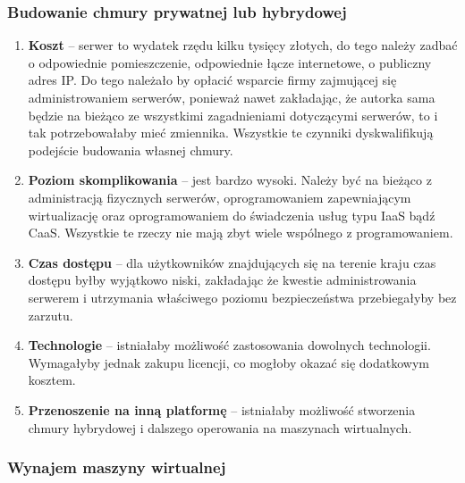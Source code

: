 \documentclass[12pt,a4paper,twoside,titlepage,openright]{book}
\begin{document}
\subsubsection{Budowanie chmury prywatnej lub hybrydowej}

\begin{enumerate}
	\item \textbf{Koszt} -- serwer to wydatek rzędu kilku tysięcy złotych, do tego należy zadbać o odpowiednie pomieszczenie, odpowiednie łącze internetowe, o publiczny adres IP. Do tego należało by opłacić wsparcie firmy zajmującej się administrowaniem serwerów, ponieważ nawet zakładając, że autorka sama będzie na bieżąco ze wszystkimi zagadnieniami dotyczącymi serwerów, to i tak potrzebowałaby mieć zmiennika. Wszystkie te czynniki dyskwalifikują podejście budowania własnej chmury. 
	\item \textbf{Poziom skomplikowania} -- jest bardzo wysoki. Należy być na bieżąco z administracją fizycznych serwerów, oprogramowaniem zapewniającym wirtualizację oraz oprogramowaniem do świadczenia usług typu IaaS bądź CaaS. Wszystkie te rzeczy nie mają zbyt wiele wspólnego z programowaniem.
	\item \textbf{Czas dostępu} -- dla użytkowników znajdujących się na terenie kraju czas dostępu byłby wyjątkowo niski, zakładając że kwestie administrowania serwerem i utrzymania właściwego poziomu bezpieczeństwa przebiegałyby bez zarzutu.
	\item \textbf{Technologie} -- istniałaby możliwość zastosowania dowolnych technologii. Wymagałyby jednak zakupu licencji, co mogłoby okazać się dodatkowym kosztem.
	\item \textbf{Przenoszenie na inną platformę} -- istniałaby możliwość stworzenia chmury hybrydowej i dalszego operowania na maszynach wirtualnych.
\end{enumerate}


\subsubsection{Wynajem maszyny wirtualnej}
\end{document}
